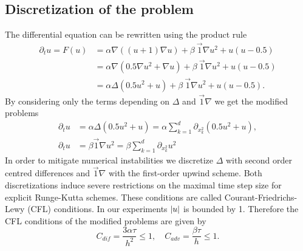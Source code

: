 \documentclass{scrartcl}
\begin{document}
	\subsection{Discretization of the problem}
	The differential equation can be rewritten using the product rule
	\begin{align*}
		\partial_{t}u = F(u) 
			&= \alpha\nabla((u+1)\nabla u) 
				+ \beta\ \vec{1}\nabla u^2
				+ u(u-0.5) \\
			&= \alpha\nabla(0.5\nabla u^2 + \nabla u) 
				+ \beta\ \vec{1}\nabla u^2 + u(u-0.5) \\
			&= \alpha\Delta(0.5 u^2 + u) 
				+ \beta\ \vec{1}\nabla u^2 + u(u-0.5).
	\end{align*}
	By considering only the terms depending on $\Delta $ and $\vec{1}\nabla $ we get the modified problems
	\begin{align*}
		\partial_{t}u &= \alpha\Delta(0.5 u^2 + u) = 
			\alpha\sum_{k=1}^d \partial_{x_k^2}(0.5 u^2 + u), \\
		\partial_{t}u &= \beta\vec{1}\nabla u^2 =
			\beta\sum_{k=1}^d \partial_{x_k^2} u^2
	\end{align*}
	In order to mitigate numerical instabilities we discretize $\Delta$ with second order centred differences and $\vec{1}\nabla$ with the first-order upwind scheme. Both discretizations induce severe restrictions on the maximal time step size for explicit Runge-Kutta schemes. These conditions are called Courant-Friedrichs-Lewy (CFL) conditions. In our experiments $\lvert u\rvert$ is bounded by 1. Therefore the CFL conditions of the modified problems are given by
		\[ C_{dif} = \frac{3\alpha\tau}{h^2} \le 1, \quad C_{adv} = \frac{\beta\tau}{h} \le 1.\]
	
	
	
\end{document}
